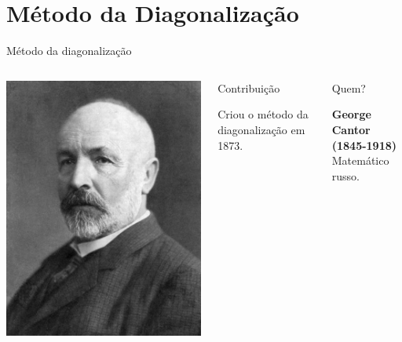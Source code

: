 \documentclass[xcolor=dvipsnames,table]{beamer}
\begin{document}
	\section{Método da Diagonalização}
	\begin{frame}{Método da diagonalização}
		\begin{columns}
			\begin{center}
				\includegraphics[height=.6\textheight]{images/cantor.jpg}
			\end{center}
			\begin{block}{Contribuição}
				\begin{center}
					{\large Criou o método da diagonalização em 1873.}
				\end{center}
			\end{block}		  		
			\begin{block}{Quem?}
				\begin{center}
					{\bf George Cantor (1845-1918)} \\ Matemático russo.
				\end{center}
			\end{block}
		\end{columns}
	\end{frame}
	
\end{document}
